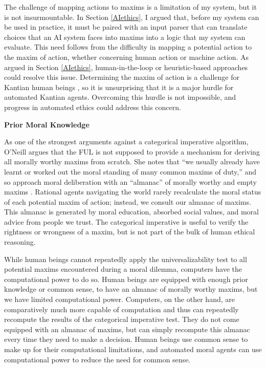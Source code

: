 \begin{isabellebody}
\begin{isamarkuptext}
The challenge of mapping actions to maxims is a limitation of my system, but it is not insurmountable. In Section \ref{AIethics},
I argued that, before my system can be used in practice, it must be paired with an input parser that can
translate choices that an AI system faces into maxims into a logic that my system can
evaluate. This need follows from the difficulty in mapping a potential action
to the maxim of action, whether concerning human action or machine action. As argued in Section \ref{AIethics},  
human-in-the-loop or heuristic-based approaches could resolve this issue. Determining the maxim of 
action is a challenge for Kantian human beings \citep{oneilluniversallaws}, so it is unsurprising that 
it is a major hurdle for automated Kantian agents. Overcoming this hurdle is not impossible, and progress
in automated ethics could address this concern.

\medskip 

\noindent \textbf{Prior Moral Knowledge}

\medskip

As one of the strongest arguments against a categorical imperative algorithm, O'Neill argues that 
the FUL is not supposed to provide a mechanism for deriving all morally worthy maxims from scratch. She notes
that ``we usually already have learnt or worked out the moral standing of many common maxims of duty,''
and so approach moral deliberation with an ``almanac'' of morally worthy and empty maxims \citep[394]{oneilluniversallaws}. 
Rational agents navigating the world rarely recalculate the moral status of each potential maxim of 
action; instead, we consult our almanac of maxims. This almanac is generated by moral education, 
absorbed social values, and moral advice from people we trust. The categorical imperative is useful 
to verify the rightness or wrongness of a maxim, but is not part of the bulk of human ethical reasoning.

While human beings cannot repeatedly apply the universalizability test to all potential maxims encountered during 
a moral dilemma, computers have the computational power to do so. Human beings are 
equipped with enough prior knowledge or common sense, to have an almanac of morally worthy maxims,
but we have limited computational power. Computers, on the other hand, are comparatively
much more capable of computation and thus can repeatedly recompute the results of the categorical
imperative test. They do not come equipped with an almanac of maxims, but can simply recompute this
almanac every time they need to make a decision. Human beings use common sense to make up for their computational
limitations, and automated moral agents can use computational power to reduce the need for common sense.


\end{isamarkuptext}
\end{isabellebody}
